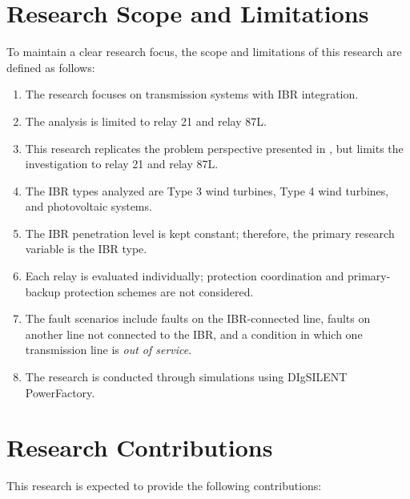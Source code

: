 \section{Research Scope and Limitations}

To maintain a clear research focus, the scope and limitations of this research are defined as follows:

\begin{enumerate}
	\item The research focuses on transmission systems with IBR integration.
	\item The analysis is limited to relay 21 and relay 87L.
	\item This research replicates the problem perspective presented in \cite{chowdhury2021tlp1}, but limits the investigation to relay 21 and relay 87L.
	\item The IBR types analyzed are Type 3 wind turbines, Type 4 wind turbines, and photovoltaic systems.
	\item The IBR penetration level is kept constant; therefore, the primary research variable is the IBR type.
	\item Each relay is evaluated individually; protection coordination and primary-backup protection schemes are not considered.
	\item The fault scenarios include faults on the IBR-connected line, faults on another line not connected to the IBR, and a condition in which one transmission line is \textit{out of service}.
	\item The research is conducted through simulations using DIgSILENT PowerFactory.
\end{enumerate}

\section{Research Contributions}

This research is expected to provide the following contributions:

